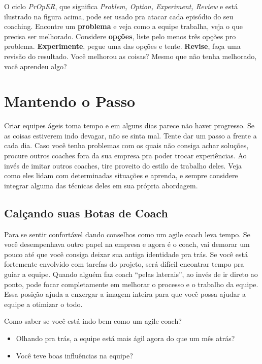 \documentclass[a4paper, 10pt, font=plain]{abnt}
\begin{document}
O ciclo \textit{PrOpER}, que significa \textit{Problem, Option, Experiment, Review} e está ilustrado na figura acima, pode ser usado pra atacar cada episódio do seu coaching.
Encontre um \textbf{problema} e veja como a equipe trabalha, veja o que precisa ser melhorado. Considere \textbf{opções}, liste pelo menos três opções pro problema. \textbf{Experimente}, pegue uma das opções e tente. \textbf{Revise}, faça uma revisão do resultado. Você melhorou as coisas? Mesmo que não tenha melhorado, você aprendeu algo?


\section{Mantendo o Passo}
Criar equipes ágeis toma tempo e em alguns dias parece não haver progresso. Se as coisas estiverem indo devagar, não se sinta mal. Tente dar um passo a frente a cada dia.
Caso você tenha problemas com os quais não consiga achar soluções, procure outros coaches fora da sua empresa pra poder trocar experiências. Ao invés de imitar outros coaches, tire proveito do estilo de trabalho deles. Veja como eles lidam com determinadas situações e aprenda, e sempre considere integrar alguma das técnicas deles em sua própria abordagem.



\subsection{Calçando suas Botas de Coach}
Para se sentir confortável dando conselhos como um agile coach leva tempo. Se você desempenhava outro papel na empresa e agora é o coach, vai demorar um pouco até que você consiga deixar sua antiga identidade pra trás.
Se você está fortemente envolvido com tarefas do projeto, será difícil encontrar tempo pra guiar a equipe. Quando alguém faz coach ``pelas laterais'', ao invés de ir direto ao ponto, pode focar completamente em melhorar o processo e o trabalho da equipe. Essa posição ajuda a enxergar a imagem inteira para que você possa ajudar a equipe a otimizar o todo.

Como saber se você está indo bem como um agile coach?
\begin{itemize}
  \item Olhando pra trás, a equipe está mais ágil agora do que um mês atrás?
  \item Você teve boas influências na equipe?
\end{itemize}
\end{document}
